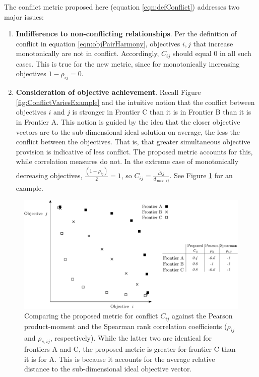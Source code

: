The conflict metric proposed here (equation \eqref{eqn:defConflict}) addresses two major issues:
\begin{enumerate}
\item \textbf{Indifference to non-conflicting relationships}. Per the definition of conflict in equation \eqref{eqn:objPairHarmony}, objectives $i,j$ that increase monotonically are not in conflict. Accordingly, $C_{ij}$ should equal 0 in all such cases. This is true for the new metric, since for monotonically increasing objectives $1-\rho_{ij} = 0$.
\item \textbf{Consideration of objective achievement}. Recall Figure \ref{fig:ConflictVariesExample} and the intuitive notion that the conflict between objectives $i$ and $j$ is stronger in Frontier C than it is in Frontier B than it is in Frontier A. This notion is guided by the idea that the closer objective vectors are to the sub-dimensional ideal solution on average, the less the conflict between the objectives. That is, that greater simultaneous objective provision is indicative of less conflict. The proposed metric accounts for this, while correlation measures do not. In the extreme case of monotonically decreasing objectives, $\frac{(1-\rho_{ij})}{2} = 1$, so $C_{ij} = \frac{\overbar{d}{ij}}{d_{\max,ij}}$. See Figure \ref{fig:WhyOursIsBetter} for an example.
\end{enumerate}
\begin{figure}[ht]
\centering
\includegraphics[width=.9\textwidth]{../images/WhyOursIsBetter}
\caption[Comparing the proposed conflict metric to others used in multi-objective optimization]{Comparing the proposed metric for conflict $C_{ij}$ against the Pearson product-moment and the Spearman rank correlation coefficients ($\rho_{ij}$ and $\rho_{s,ij}$, respectively). While the latter two are identical for frontiers A and C, the proposed metric is greater for frontier C than it is for A. This is because it accounts for the average relative distance to the sub-dimensional ideal objective vector.}
\label{fig:WhyOursIsBetter}
\end{figure}

